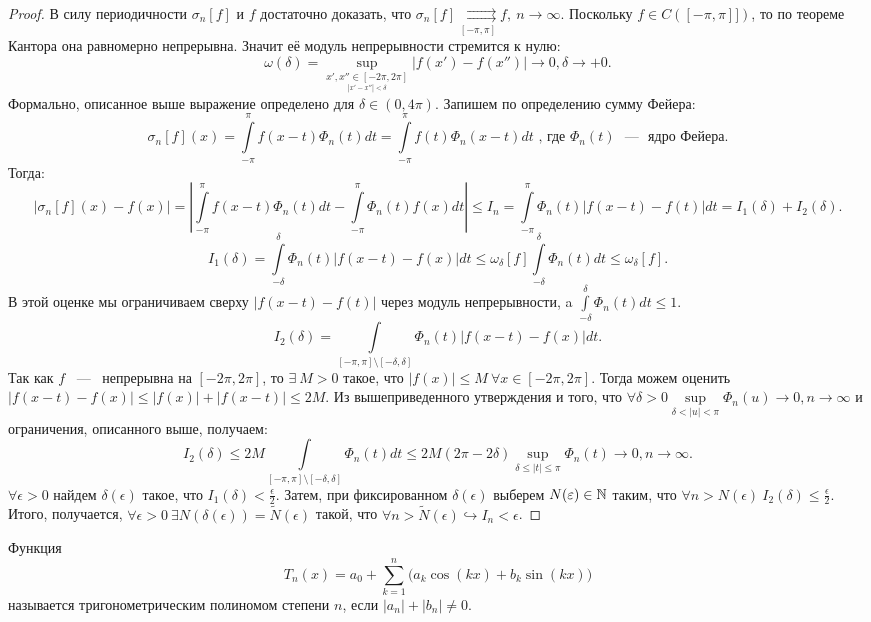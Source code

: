 \begin{proof}
    В силу периодичности $\sigma_n[f]$ и $f$ достаточно доказать, что $\sigma_n[f] \underset{[-\pi, \pi]}{\rightrightarrows} f, \ n \rightarrow \infty$.
    Поскольку $f \in C([-\pi, \pi]])$, то по теореме Кантора она равномерно непрерывна. Значит её модуль непрерывности стремится к нулю:
    $$
    \omega(\delta) = \sup\limits_{\underset{|x' - x''| < \delta}{x', x'' \in [-2\pi, 2\pi]}} |f(x') - f(x'')| \rightarrow 0, \delta \rightarrow +0.
    $$
    Формально, описанное выше выражение определено для $\delta \in (0, 4\pi).$ Запишем по определению сумму Фейера:
    $$
    \sigma_n[f](x) = \int\limits_{-\pi}^{\pi}f(x - t) \Phi_n(t) dt = \int\limits_{-\pi}^{\pi}f(t)\Phi_n(x - t) dt \text{ , где } \Phi_n(t) \text{ ~---~ ядро Фейера}.
    $$
    Тогда:
    $$
    |\sigma_n[f](x) - f(x)| = \left| \int\limits_{-\pi}^{\pi} f(x - t)\Phi_n(t)dt - \int\limits_{-\pi}^{\pi} \Phi_n(t) f(x) dt \right| \le I_n = \int\limits_{-\pi}^{\pi} \Phi_n(t) |f(x - t) - f(t)| dt = I_1(\delta) + I_2(\delta).
    $$
    $$
    I_1(\delta) = \int\limits_{-\delta}^{\delta}\Phi_n(t) |f(x - t) - f(x)| dt \le \omega_{\delta}[f] \int\limits_{-\delta}^{\delta} \Phi_n(t) dt \le \omega_{\delta}[f].
    $$
    В этой оценке мы ограничиваем сверху $|f(x - t) - f(t)|$ через модуль непрерывности, \newline  a $\int\limits_{-\delta}^{\delta} \Phi_n(t) dt \le 1$.
    $$
    I_2(\delta) = \int\limits_{[-\pi, \pi] \setminus [-\delta, \delta]} \Phi_n(t) |f(x - t) - f(x)| dt.
    $$
    Так как $f$ ~---~ непрерывна на $[-2\pi, 2\pi]$, то $\exists \ M > 0$ такое, что $|f(x)| \le M \ \forall x \in [-2\pi, 2\pi]$. Тогда можем оценить $|f(x - t) - f(x)| \le |f(x)| + |f(x - t)| \le 2M$. \newline
    Из вышеприведенного утверждения и того, что $\forall \delta > 0 \sup\limits_{\delta < |u| < \pi} \Phi_n(u) \rightarrow 0, n \rightarrow \infty$ и ограничения, описанного выше, получаем:
    $$
    I_2(\delta) \le 2M \int\limits_{[-\pi, \pi] \setminus [-\delta, \delta]} \Phi_n(t) dt \le 2M (2\pi - 2\delta) \sup\limits_{\delta \le |t| \le \pi} \Phi_n(t) \rightarrow 0, n \rightarrow \infty.
    $$
    $\forall \epsilon > 0$ найдем $\delta(\epsilon)$ такое, что $I_1(\delta) < \frac{\epsilon}{2}$. Затем, при фиксированном $\delta(\epsilon)$ выберем $N(\varepsilon) \in \mathbb{N}$ таким, что $\forall n > N(\epsilon) \ I_2(\delta) \le \frac{\epsilon}{2}$. \newline
    Итого, получается, $\forall \epsilon > 0 \ \exists N(\delta(\epsilon)) = \tilde{N}(\epsilon)$ такой, что $\forall n > \tilde{N}(\epsilon) \hookrightarrow I_n < \epsilon$.
\end{proof}
\begin{definition}
    Функция
    \[
        T_n(x) = a_0 + \sum_{k=1}^{n}\bigl(a_k\cos(kx) + b_k\sin(kx)\bigr)
    \]
    называется тригонометрическим полиномом степени \(n\), если $|a_n| + |b_n| \neq 0.$
\end{definition}


